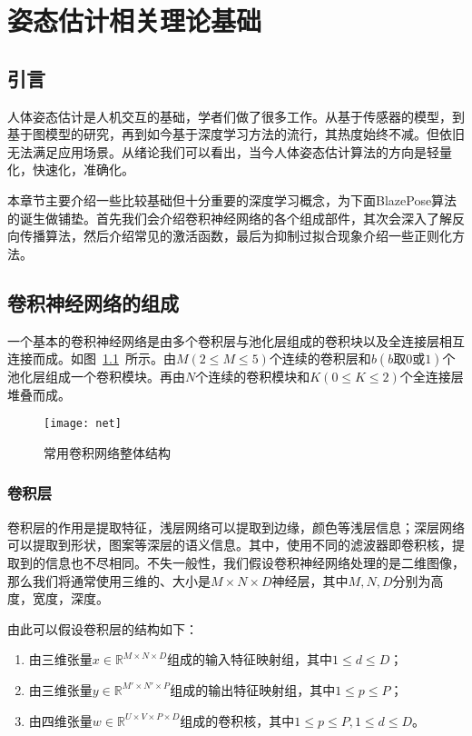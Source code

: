 
\chapter{姿态估计相关理论基础}

\section{引言}

人体姿态估计是人机交互的基础，学者们做了很多工作。从基于传感器的模型，到基于图模型的研究，再到如今基于深度学习方法的流行，其热度始终不减。但依旧无法满足应用场景。从绪论我们可以看出，当今人体姿态估计算法的方向是轻量化，快速化，准确化。

本章节主要介绍一些比较基础但十分重要的深度学习概念，为下面BlazePose算法的诞生做铺垫。首先我们会介绍卷积神经网络的各个组成部件，其次会深入了解反向传播算法，然后介绍常见的激活函数，最后为抑制过拟合现象介绍一些正则化方法。

\section{卷积神经网络的组成}

一个基本的卷积神经网络是由多个卷积层与池化层组成的卷积块以及全连接层相互连接而成。如图~\ref{piture:4}~所示。由$M(2\leqslant M\leqslant 5)$个连续的卷积层和$b(b\text{取}0\text{或}1)$个池化层组成一个卷积模块。再由$N$个连续的卷积模块和$K(0\leqslant K\leqslant 2)$个全连接层堆叠而成。

\begin{figure}[h]
\centering
\texttt{[image: net]}
\caption{常用卷积网络整体结构}
\label{piture:4}
\end{figure}

\subsection{卷积层}
卷积层的作用是提取特征，浅层网络可以提取到边缘，颜色等浅层信息；深层网络可以提取到形状，图案等深层的语义信息。其中，使用不同的滤波器即卷积核，提取到的信息也不尽相同。不失一般性，我们假设卷积神经网络处理的是二维图像，那么我们将通常使用三维的、大小是$M\times N\times D$神经层，其中$M,N,D$分别为高度，宽度，深度。

由此可以假设卷积层的结构如下：

\begin{enumerate}
\item 由三维张量$x\in \mathbb{R}^{M\times N\times D}$组成的输入特征映射组，其中$1\leqslant d\leqslant D$；

\item 由三维张量$y\in \mathbb{R}^{M'\times N'\times P}$组成的输出特征映射组，其中$1\leqslant p\leqslant P$；

\item 由四维张量$w\in \mathbb{R}^{U\times V\times P\times D}$组成的卷积核，其中$1\leqslant p\leqslant P,1\leqslant d\leqslant D$。
\end{enumerate}

